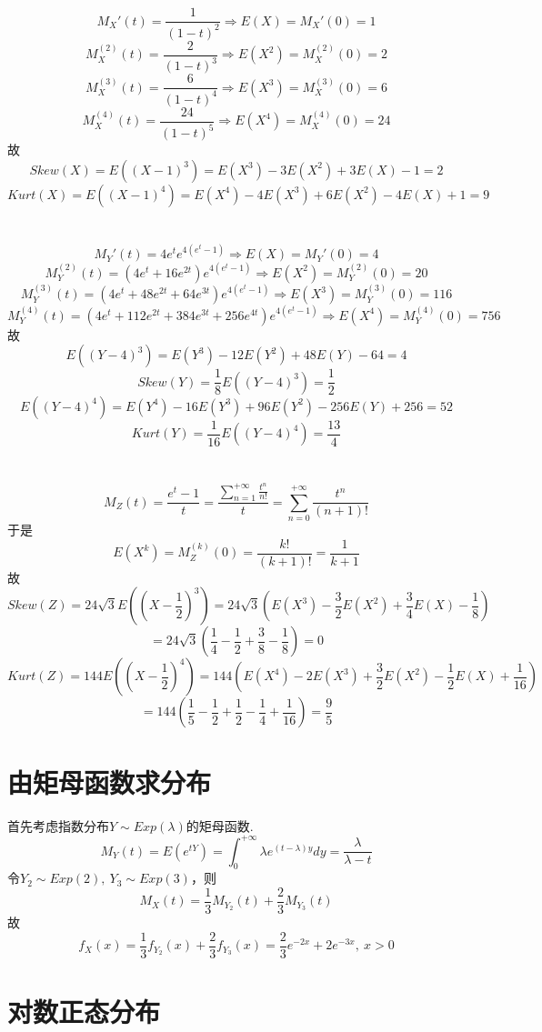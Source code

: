 \documentclass{article}
\begin{document}
\begin{CJK}{UTF8}{gbsn}
\subsection{}
$$ M_{X}'(t)=\frac{1}{(1-t)^{2}}\Rightarrow E(X)=M_{X}'(0)=1 $$
$$ M_{X}^{(2)}(t)=\frac{2}{(1-t)^{3}}\Rightarrow E(X^{2})=M_{X}^{(2)}(0)=2 $$
$$ M_{X}^{(3)}(t)=\frac{6}{(1-t)^{4}}\Rightarrow E(X^{3})=M_{X}^{(3)}(0)=6 $$
$$ M_{X}^{(4)}(t)=\frac{24}{(1-t)^{5}}\Rightarrow E(X^{4})=M_{X}^{(4)}(0)=24 $$
故
$$ Skew(X)=E((X-1)^{3})=E(X^{3})-3E(X^{2})+3E(X)-1=2$$
$$ Kurt(X)=E((X-1)^{4})=E(X^{4})-4E(X^{3})+6E(X^{2})-4E(X)+1=9$$
\\\\
$$ M_{Y}'(t)=4e^{t}e^{4(e^{t}-1)}\Rightarrow E(X)=M_{Y}'(0)=4$$
$$ M_{Y}^{(2)}(t)=(4e^{t}+16e^{2t})e^{4(e^{t}-1)}\Rightarrow E(X^{2})=M_{Y}^{(2)}(0)=20$$
$$ M_{Y}^{(3)}(t)=(4e^{t}+48e^{2t}+64e^{3t})e^{4(e^{t}-1)}\Rightarrow E(X^{3})=M_{Y}^{(3)}(0)=116$$
$$ M_{Y}^{(4)}(t)=(4e^{t}+112e^{2t}+384e^{3t}+256e^{4t})e^{4(e^{t}-1)}\Rightarrow E(X^{4})=M_{Y}^{(4)}(0)=756$$
故
$$ E((Y-4)^{3})=E(Y^{3})-12E(Y^{2})+48E(Y)-64=4$$
$$ Skew(Y)=\frac{1}{8}E((Y-4)^{3})=\frac{1}{2}$$
$$ E((Y-4)^{4})=E(Y^{4})-16E(Y^{3})+96E(Y^{2})-256E(Y)+256=52$$
$$ Kurt(Y)=\frac{1}{16}E((Y-4)^{4})=\frac{13}{4}$$
\\\\
$$ M_{Z}(t)=\frac{e^{t}-1}{t}=\frac{\sum\limits_{n=1}^{+\infty}\frac{t^{n}}{n!}}{t}=\sum\limits_{n=0}^{+\infty}\frac{t^{n}}{(n+1)!}$$
于是
$$ E(X^{k})=M_{Z}^{(k)}(0)=\frac{k!}{(k+1)!}=\frac{1}{k+1}$$
故
$$ Skew(Z)=24\sqrt{3}E((X-\frac{1}{2})^{3})=24\sqrt{3}(E(X^{3})-\frac{3}{2}E(X^{2})+\frac{3}{4}E(X)-\frac{1}{8})$$
$$ =24\sqrt{3}(\frac{1}{4}-\frac{1}{2}+\frac{3}{8}-\frac{1}{8})=0$$
$$ Kurt(Z)=144E((X-\frac{1}{2})^{4})=144(E(X^{4})-2E(X^{3})+\frac{3}{2}E(X^{2})-\frac{1}{2}E(X)+\frac{1}{16})$$
$$ =144(\frac{1}{5}-\frac{1}{2}+\frac{1}{2}-\frac{1}{4}+\frac{1}{16})=\frac{9}{5}$$
\section{由矩母函数求分布}
首先考虑指数分布$Y\sim Exp(\lambda)$的矩母函数.
$$ M_{Y}(t)=E(e^{tY})=\int_{0}^{+\infty}\lambda e^{(t-\lambda)y}dy=\frac{\lambda}{\lambda-t}$$
令$Y_{2}\sim Exp(2),\ Y_{3}\sim Exp(3)$，则
$$ M_{X}(t)=\frac{1}{3}M_{Y_{2}}(t)+\frac{2}{3}M_{Y_{3}}(t)$$
故
$$ f_{X}(x)=\frac{1}{3}f_{Y_{2}}(x)+\frac{2}{3}f_{Y_{3}}(x)=\frac{2}{3}e^{-2x}+2e^{-3x},\ x>0$$
\section{对数正态分布}

\end{CJK}
\end{document}
